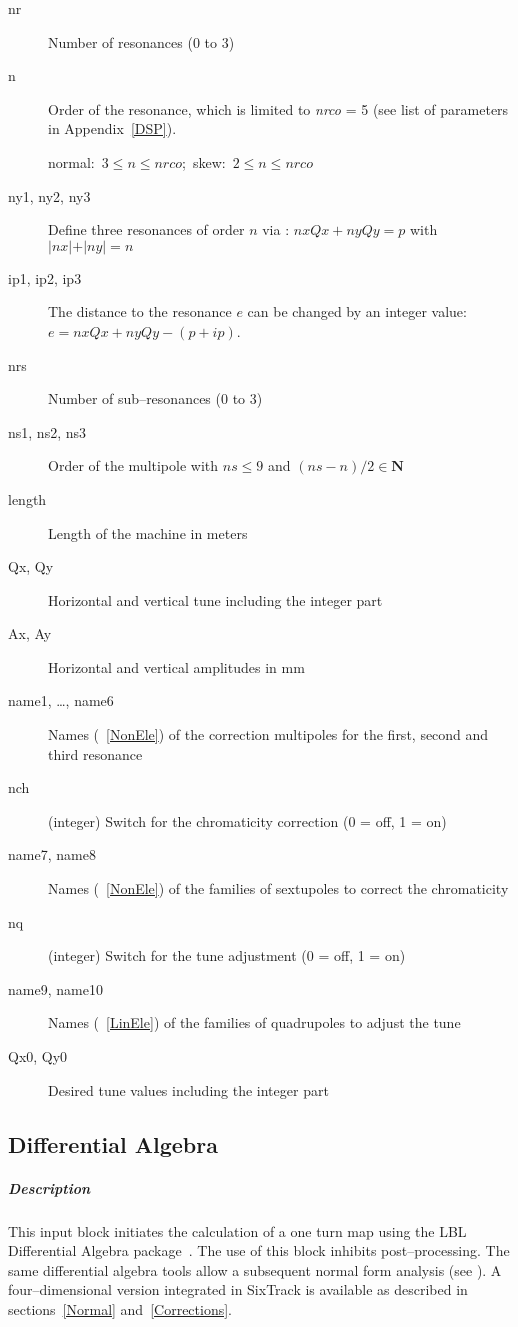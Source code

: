 \documentclass[a4paper,11pt]{report}
\begin{document}
\begin{description}
\item [nr] Number of resonances (0 to 3)
\item [n] Order of the resonance, which is limited to {\em nrco} \/= 5
  (see list of parameters in Appendix~\ref{DSP}).
  
  \mbox{normal: $ 3 \le n \le nrco $; skew: $ 2 \le n \le nrco $}
\item [ny1, ny2, ny3] Define three resonances of order $n$ via :
  \mbox{$ nx Qx + ny Qy = p $} with \mbox{$ \vert nx \vert + \vert ny
    \vert = n $}
\item [ip1, ip2, ip3] The distance to the resonance $ e $ can be
  changed by an integer value: \newline \mbox{$ e = nx Qx + ny Qy -
    (p+ip) $.}
\item [nrs] Number of sub--resonances (0 to 3)
\item [ns1, ns2, ns3] Order of the multipole with \mbox{$ ns \le 9 $}
  and \mbox{$ (ns-n)/2 \in {\mathbf N} $}
\item [length] Length of the machine in meters
\item [Qx, Qy] Horizontal and vertical tune including the integer part
\item [Ax, Ay] Horizontal and vertical amplitudes in mm
\item [name1, \dots, name6] Names (~\ref{NonEle}) of the correction
  multipoles for the first, second and third resonance
\item [nch] (integer) Switch for the chromaticity correction (0 = off,
  1 = on)
\item [name7, name8] Names (~\ref{NonEle}) of the families of
  sextupoles to correct the chromaticity
\item [nq] (integer) Switch for the tune adjustment (0 = off, 1 = on)
\item [name9, name10] Names (~\ref{LinEle}) of the families of
  quadrupoles to adjust the tune
\item [Qx0, Qy0] Desired tune values including the integer part
\end{description}

\subsection{Differential Algebra} \label{DifAlg}

\subparagraph{Description} This input block initiates the calculation
of a one turn map using the LBL Differential Algebra
package~\cite{DALIE}.  The use of this block inhibits
post--processing. The same differential algebra tools allow a
subsequent normal form analysis (see \cite{Forest89}).  A
four--dimensional version integrated in SixTrack is available as
described in sections~\ref{Normal} and~\ref{Corrections}.
\end{document}
